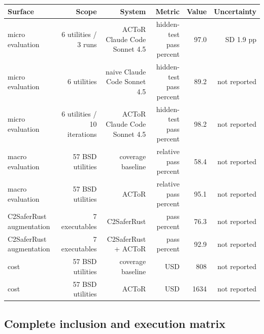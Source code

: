 \documentclass{article}
\begin{document}
\begin{tabular}{lrrrrr}
\toprule
Surface & Scope & System & Metric & Value & Uncertainty \\
\midrule
micro evaluation & 6 utilities / 3 runs & ACToR Claude Code Sonnet 4.5 & hidden-test pass percent & 97.0 & SD 1.9 pp \\
micro evaluation & 6 utilities & naive Claude Code Sonnet 4.5 & hidden-test pass percent & 89.2 & not reported \\
micro evaluation & 6 utilities / 10 iterations & ACToR Claude Code Sonnet 4.5 & hidden-test pass percent & 98.2 & not reported \\
macro evaluation & 57 BSD utilities & coverage baseline & relative pass percent & 58.4 & not reported \\
macro evaluation & 57 BSD utilities & ACToR & relative pass percent & 95.1 & not reported \\
C2SaferRust augmentation & 7 executables & C2SaferRust & pass percent & 76.3 & not reported \\
C2SaferRust augmentation & 7 executables & C2SaferRust + ACToR & pass percent & 92.9 & not reported \\
cost & 57 BSD utilities & coverage baseline & USD & 808 & not reported \\
cost & 57 BSD utilities & ACToR & USD & 1634 & not reported \\
\bottomrule
\end{tabular}

\subsection*{Complete inclusion and execution matrix}
\end{document}
